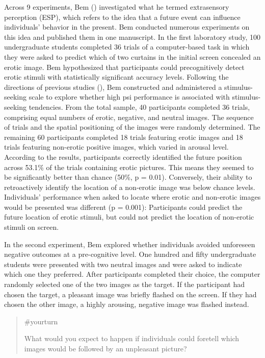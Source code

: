\documentclass[
  letterpaper,
]{book}
\begin{document}
Across 9 experiments, Bem ()
investigated what he termed extrasensory perception (ESP), which refers
to the idea that a future event can influence individuals' behavior in
the present. Bem conducted numerous experiments on this idea and
published them in one manuscript. In the first laboratory study, 100
undergraduate students completed 36 trials of a computer-based task in
which they were asked to predict which of two curtains in the initial
screen concealed an erotic image. Bem hypothesized that participants
could precognitively detect erotic stimuli with statistically
significant accuracy levels. Following the directions of previous
studies (), Bem
constructed and administered a stimulus-seeking scale to explore whether
high psi performance is associated with stimulus-seeking tendencies.
From the total sample, 40 participants completed 36 trials, comprising
equal numbers of erotic, negative, and neutral images. The sequence of
trials and the spatial positioning of the images were randomly
determined. The remaining 60 participants completed 18 trials featuring
erotic images and 18 trials featuring non-erotic positive images, which
varied in arousal level. According to the results, participants
correctly identified the future position across 53.1\% of the trials
containing erotic pictures. This means they seemed to be significantly
better than chance (50\%, p = 0.01). Conversely, their ability to
retroactively identify the location of a non-erotic image was below
chance levels. Individuals' performance when asked to locate where
erotic and non-erotic images would be presented was different (p =
0.001): Participants could predict the future location of erotic
stimuli, but could not predict the location of non-erotic stimuli on
screen.

In the second experiment, Bem explored whether individuals avoided
unforeseen negative outcomes at a pre-cognitive level. One hundred and
fifty undergraduate students were presented with two neutral images and
were asked to indicate which one they preferred. After participants
completed their choice, the computer randomly selected one of the two
images as the target. If the participant had chosen the target, a
pleasant image was briefly flashed on the screen. If they had chosen the
other image, a highly arousing, negative image was flashed instead.

\begin{quote}
{\#yourturn}

What would you expect to happen if individuals could foretell which
images would be followed by an unpleasant picture?
\end{quote}
\end{document}
